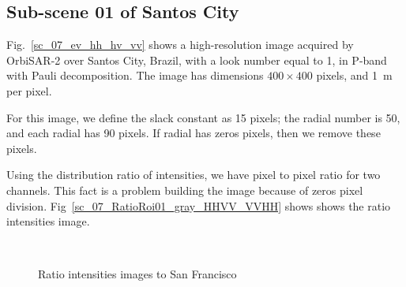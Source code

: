 \documentclass[remotesensing,article,submit,pdftex,moreauthors]{Definitions/mdpi}
\begin{document}
\subsection{Sub-scene 01 of Santos City} 
Fig.~\eqref{sc_07_ev_hh_hv_vv} shows a high-resolution image acquired by OrbiSAR-2 over Santos City, Brazil, with a look number equal to 1, in P-band with Pauli decomposition. The image has dimensions $400 \times 400$ pixels, and \SI{1}{\meter} per pixel. 

For this image, we define the slack constant as 15 pixels; the radial number is 50, and each radial has 90 pixels. If radial has zeros pixels, then we remove these pixels.

Using the distribution ratio of intensities, we have pixel to pixel ratio for two channels. This fact is a problem building the image because of zeros pixel division. Fig~\eqref{sc_07_RatioRoi01_gray_HHVV_VVHH} shows shows the ratio intensities image.    
\begin{figure}[hbt]
	\centering
     \\
     \caption{Ratio intensities images to San Francisco}
     \label{sc_07_RatioRoi01_gray_HHVV_VVHH} 
   \end{figure}
\end{document}
